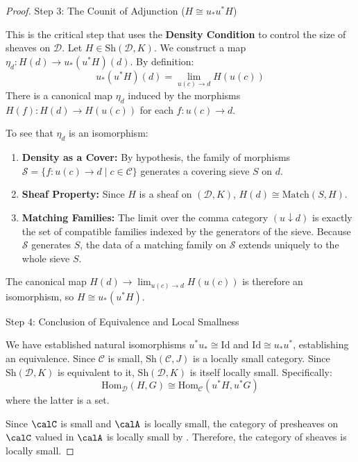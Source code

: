 \begin{proof}
Step 3: The Counit of Adjunction ($H \cong u_* u^* H$)

This is the critical step that uses the \textbf{Density Condition} to control the size of sheaves on $\mathcal{D}$. Let $H \in \text{Sh}(\mathcal{D}, K)$. We construct a map $\eta_d: H(d) \to u_*(u^*H)(d)$. By definition:
\[ u_*(u^*H)(d) = \lim_{u(c) \to d} H(u(c)) \]
There is a canonical map $\eta_d$ induced by the morphisms $H(f): H(d) \to H(u(c))$ for each $f: u(c) \to d$. 

To see that $\eta_d$ is an isomorphism:
\begin{enumerate}
    \item \textbf{Density as a Cover:} By hypothesis, the family of morphisms $\mathcal{S} = \{ f: u(c) \to d \mid c \in \mathcal{C} \}$ generates a covering sieve $S$ on $d$.
    \item \textbf{Sheaf Property:} Since $H$ is a sheaf on $(\mathcal{D}, K)$, $H(d) \cong \text{Match}(S, H)$.
    \item \textbf{Matching Families:} The limit over the comma category $(u \downarrow d)$ is exactly the set of compatible families indexed by the generators of the sieve. Because $\mathcal{S}$ generates $S$, the data of a matching family on $\mathcal{S}$ extends uniquely to the whole sieve $S$.
\end{enumerate}
The canonical map $H(d) \to \lim_{u(c) \to d} H(u(c))$ is therefore an isomorphism, so $H \cong u_* (u^* H)$.

Step 4: Conclusion of Equivalence and Local Smallness

We have established natural isomorphisms $u^* u_* \cong \text{Id}$ and $\text{Id} \cong u_* u^*$, establishing an equivalence. Since $\mathcal{C}$ is small, $\text{Sh}(\mathcal{C}, J)$ is a locally small category. Since $\text{Sh}(\mathcal{D}, K)$ is equivalent to it, $\text{Sh}(\mathcal{D}, K)$ is itself locally small. Specifically:
\[ \text{Hom}_{\mathcal{D}}(H, G) \cong \text{Hom}_{\mathcal{C}}(u^*H, u^*G) \]
where the latter is a set.



    Since $\calC$ is small and $\calA$ is locally small, the category of presheaves on $\calC$ valued in $\calA$ is locally small by . Therefore, the category of sheaves is locally small.
\end{proof}
